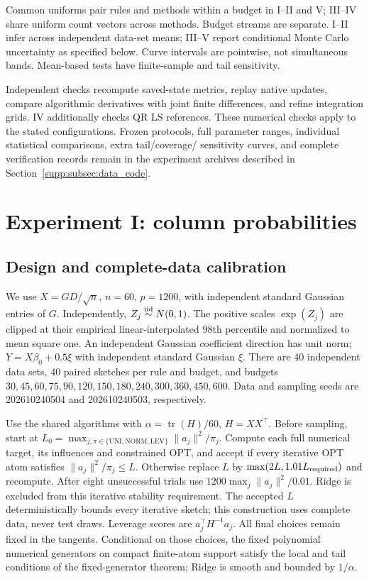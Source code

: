\documentclass[11pt,a4paper,leqno]{article}
\numberwithin{equation}{section}
\numberwithin{figure}{section}
\numberwithin{table}{section}
\theoremstyle{plain}
\theoremstyle{definition}
\theoremstyle{remark}
\begin{document}
Common uniforms pair rules and methods within a budget in I--II and V;
III--IV share uniform count vectors across methods. Budget streams are
separate. I--II infer across independent data-set means; III--V report
conditional Monte Carlo uncertainty as specified below. Curve intervals
are pointwise, not simultaneous bands. Mean-based tests have finite-sample
and tail sensitivity.

Independent checks recompute saved-state metrics, replay native updates,
compare algorithmic derivatives with joint finite differences, and refine
integration grids. IV additionally checks QR LS references. These numerical
checks apply to the stated configurations. Frozen protocols, full
parameter ranges, individual statistical comparisons, extra tail/coverage/
sensitivity curves, and complete verification records remain in the
experiment archives described in Section~\ref{supp:subsec:data_code}.




\section{Experiment I: column probabilities}
\label{supp:sec:native_exp1}
\subsection{Design and complete-data calibration}
We use $X=GD/\sqrt n$, $n=60$, $p=1200$, with independent standard
Gaussian entries of $G$. Independently, $Z_j\stackrel{\rm iid}{\sim}N(0,1)$.
The positive scales $\exp(Z_j)$ are clipped at
their empirical linear-interpolated 98th percentile and normalized to mean
square one. An independent Gaussian coefficient direction has unit norm;
$Y=X\beta_0+0.5\xi$ with independent standard Gaussian $\xi$.
There are 40 independent data sets, 40 paired sketches per rule and budget,
and budgets $30,45,60,75,90,120,150,180,240,300,360,450,600$.
Data and sampling seeds are 202610240504 and 202610240503, respectively.

Use the shared algorithms with $\alpha=\operatorname{tr}(H)/60$,
$H=XX^\top$. Before sampling, start at
$L_0=\max_{j,\pi\in\{\mathrm{UNI,NORM,LEV}\}}\|a_j\|^2/\pi_j$.
Compute each full numerical target, its influences and constrained OPT,
and accept if every iterative OPT atom satisfies $\|a_j\|^2/\pi_j\leq L$.
Otherwise replace $L$ by $\max(2L,1.01L_{\rm required})$ and recompute.
After eight unsuccessful trials use $1200\max_j\|a_j\|^2/0.01$.
Ridge is excluded from this iterative stability requirement.
The accepted $L$ deterministically bounds every iterative sketch; this
construction uses complete data, never test draws. Leverage scores are
$a_j^\top H^{-1}a_j$. All final choices remain fixed in the tangents.
Conditional on those choices, the fixed polynomial numerical generators
on compact finite-atom support satisfy the local and tail conditions of
the fixed-generator theorem; Ridge is smooth and bounded by $1/\alpha$.
\end{document}
